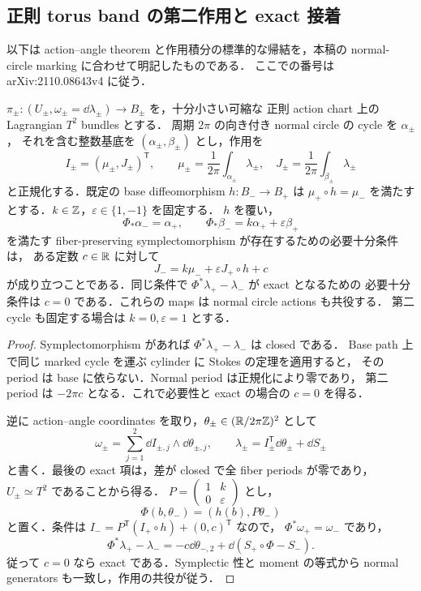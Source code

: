 \subsection{正則 torus band の第二作用と exact 接着}

以下は action--angle theorem と作用積分の標準的な帰結を，本稿の normal-circle marking
に合わせて明記したものである\cite[Theorem~1.42, Lemma~2.15, Remark~2.17, Lemma~2.25]{Evans}．
ここでの番号は arXiv:2110.08643v4 に従う．

\begin{proposition}
\label{neck:regular-period-matching}
$\pi_\pm:(U_\pm,\omega_\pm=\dd\lambda_\pm)\to B_\pm$ を，十分小さい可縮な
正則 action chart 上の Lagrangian $T^2$ bundles とする．
周期 $2\pi$ の向き付き normal circle の cycle を $\alpha_\pm$，
それを含む整数基底を $(\alpha_\pm,\beta_\pm)$ とし，作用を
\[
 I_\pm=(\mu_\pm,J_\pm)^{\mathsf T},\qquad
 \mu_\pm=\frac1{2\pi}\int_{\alpha_\pm}\lambda_\pm,
 \quad J_\pm=\frac1{2\pi}\int_{\beta_\pm}\lambda_\pm
\]
と正規化する．既定の base diffeomorphism $h:B_-\to B_+$ は
$\mu_+\circ h=\mu_-$ を満たすとする．$k\in\mathbb Z$，$\varepsilon\in\{1,-1\}$ を固定する．
$h$ を覆い，
\[
 \Phi_*\alpha_-=\alpha_+,
 \qquad \Phi_*\beta_-=k\alpha_++\varepsilon\beta_+
\]
を満たす fiber-preserving symplectomorphism が存在するための必要十分条件は，
ある定数 $c\in\mathbb R$ に対して
\begin{equation}\label{neck:second-action-test}
 J_-=k\mu_-+\varepsilon J_+\circ h+c
\end{equation}
が成り立つことである．同じ条件で $\Phi^*\lambda_+-\lambda_-$ が exact となるための
必要十分条件は $c=0$ である．これらの maps は normal circle actions も共役する．
第二 cycle も固定する場合は $k=0,\varepsilon=1$ とする．
\end{proposition}

\begin{proof}
Symplectomorphism があれば $\Phi^*\lambda_+-\lambda_-$ は closed である．
Base path 上で同じ marked cycle を運ぶ cylinder に Stokes の定理を適用すると，
その period は base に依らない．Normal period は正規化により零であり，
第二 period は $-2\pi c$ となる．これで必要性と exact の場合の $c=0$ を得る．

逆に action--angle coordinates を取り，$\theta_\pm\in(\mathbb R/2\pi\mathbb Z)^2$ として
\[
 \omega_\pm=\sum_{j=1}^2\dd I_{\pm,j}\wedge\dd\theta_{\pm,j},
 \qquad \lambda_\pm=I_\pm^{\mathsf T}\dd\theta_\pm+\dd S_\pm
\]
と書く．最後の exact 項は，差が closed で全 fiber periods が零であり，
$U_\pm\simeq T^2$ であることから得る．
$P=\left(\begin{smallmatrix}1&k\\0&\varepsilon\end{smallmatrix}\right)$ とし，
\[
 \Phi(b,\theta_-)=(h(b),P\theta_-)
\]
と置く．条件は $I_-=P^{\mathsf T}(I_+\circ h)+(0,c)^{\mathsf T}$ なので，
$\Phi^*\omega_+=\omega_-$ であり，
\[
 \Phi^*\lambda_+-\lambda_-
 =-c\dd\theta_{-,2}+\dd(S_+\circ\Phi-S_-).
\]
従って $c=0$ なら exact である．Symplectic 性と moment の等式から normal generators
も一致し，作用の共役が従う．
\end{proof}

